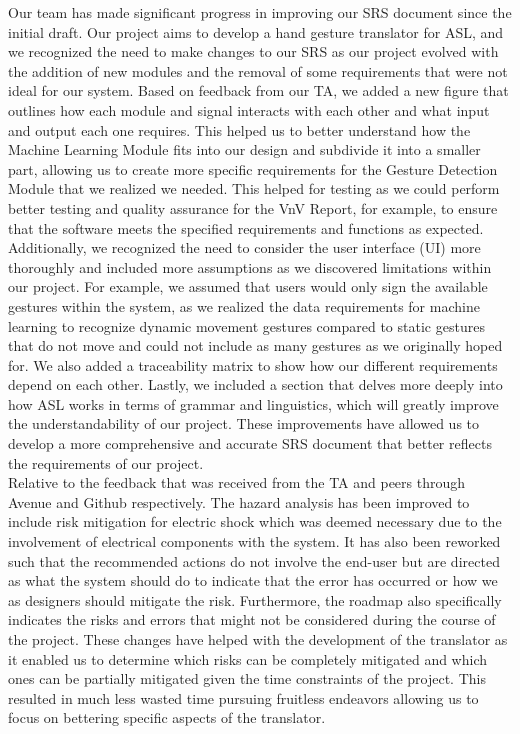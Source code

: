 \documentclass[12pt, titlepage]{article}
\begin{document}
Our team has made significant progress in improving our SRS document since the initial draft. Our project aims to develop a hand gesture translator for ASL, and we recognized the need to make changes to our SRS as our project evolved with the addition of new modules and the removal of some requirements that were not ideal for our system. Based on feedback from our TA, we added a new figure that outlines how each module and signal interacts with each other and what input and output each one requires. This helped us to better understand how the Machine Learning Module fits into our design and subdivide it into a smaller part, allowing us to create more specific requirements for the Gesture Detection Module that we realized we needed. This helped for testing as we could perform better testing and quality assurance for the VnV Report, for example, to ensure that the software meets the specified requirements and functions as expected. Additionally, we recognized the need to consider the user interface (UI) more thoroughly and included more assumptions as we discovered limitations within our project. For example, we assumed that users would only sign the available gestures within the system, as we realized the data requirements for machine learning to recognize dynamic movement gestures compared to static gestures that do not move and could not include as many gestures as we originally hoped for. We also added a traceability matrix to show how our different requirements depend on each other. Lastly, we included a section that delves more deeply into how ASL works in terms of grammar and linguistics, which will greatly improve the understandability of our project. These improvements have allowed us to develop a more comprehensive and accurate SRS document that better reflects the requirements of our project.\\

\noindent Relative to the feedback that was received from the TA and peers through Avenue and Github respectively. The hazard analysis has been improved to include risk mitigation for electric shock which was deemed necessary due to the involvement of electrical components with the system. It has also been reworked such that the recommended actions do not involve the end-user but are directed as what the system should do to indicate that the error has occurred or how we as designers should mitigate the risk. Furthermore, the roadmap also specifically indicates the risks and errors that might not be considered during the course of the project. These changes have helped with the development of the translator as it enabled us to determine which risks can be completely mitigated and which ones can be partially mitigated given the time constraints of the project. This resulted in much less wasted time pursuing fruitless endeavors allowing us to focus on bettering specific aspects of the translator.\\
\end{document}
